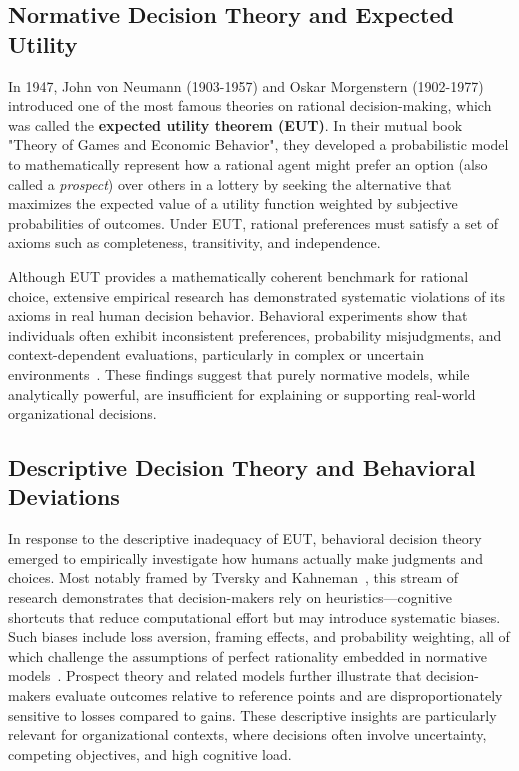 \documentclass{sfuthesis}
\begin{document}
\subsection{Normative Decision Theory and Expected Utility}
In 1947, John von Neumann (1903-1957) and Oskar Morgenstern (1902-1977) introduced one of the most famous theories on rational decision-making, which was called the \textbf{expected utility theorem (EUT)}. In their mutual book "Theory of Games and Economic Behavior", they developed a probabilistic model to mathematically represent how a rational agent might prefer an option (also called a \textit{prospect}) over others in a lottery by seeking the alternative that maximizes the expected value of a utility function weighted by subjective probabilities of outcomes. Under EUT, rational preferences must satisfy a set of axioms such as completeness, transitivity, and independence.\par
Although EUT provides a mathematically coherent benchmark for rational choice, extensive empirical research has demonstrated systematic violations of its axioms in real human decision behavior. Behavioral experiments show that individuals often exhibit inconsistent preferences, probability misjudgments, and context-dependent evaluations, particularly in complex or uncertain environments~\cite{edwards_behavioral_1961, briggs_normative_2014}. These findings suggest that purely normative models, while analytically powerful, are insufficient for explaining or supporting real-world organizational decisions.
\subsection{Descriptive Decision Theory and Behavioral Deviations}
In response to the descriptive inadequacy of EUT, behavioral decision theory emerged to empirically investigate how humans actually make judgments and choices. Most notably framed by Tversky and Kahneman~\cite{tversky1978judgment}, this stream of research demonstrates that decision-makers rely on heuristics—cognitive shortcuts that reduce computational effort but may introduce systematic biases. Such biases include loss aversion, framing effects, and probability weighting, all of which challenge the assumptions of perfect rationality embedded in normative models~\cite{einhorn1981behavioral,frisch_beyond_1994}. Prospect theory and related models further illustrate that decision-makers evaluate outcomes relative to reference points and are disproportionately sensitive to losses compared to gains. These descriptive insights are particularly relevant for organizational contexts, where decisions often involve uncertainty, competing objectives, and high cognitive load.
\end{document}
